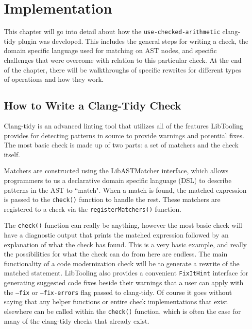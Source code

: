 \chapter{Implementation}
\label{sec:implementation}

This chapter will go into detail about how the \texttt{use-checked-arithmetic} clang-tidy plugin was developed. This includes the general steps for writing a check, the domain specific language used for matching on AST nodes, and specific challenges that were overcome with relation to this particular check. At the end of the chapter, there will be walkthroughs of specific rewrites for different types of operations and how they work.

\section{How to Write a Clang-Tidy Check}

Clang-tidy is an advanced linting tool that utilizes all of the features LibTooling provides for detecting patterns in source to provide warnings and potential fixes. The most basic check is made up of two parts: a set of matchers and the check itself.

Matchers are constructed using the LibASTMatcher interface, which allows programmers to us a declarative domain specific language (DSL) to describe patterns in the AST to ``match". When a match is found, the matched expression is passed to the \texttt{check()} function to handle the rest. These matchers are registered to a check via the \texttt{registerMatchers()} function.

The \texttt{check()} function can really be anything, however the most basic check will have a diagnostic output that prints the matched expression followed by an explanation of what the check has found. This is a very basic example, and really the possibilities for what the check can do from here are endless. The main functionality of a code modernization check will be to generate a rewrite of the matched statement. LibTooling also provides a convenient \texttt{FixItHint} interface for generating suggested code fixes beside their warnings that a user can apply with the \texttt{--fix} or \texttt{--fix-errors} flag passed to clang-tidy. Of course it goes without saying that any helper functions or entire check implementations that exist elsewhere can be called within the \texttt{check()} function, which is often the case for many of the clang-tidy checks that already exist.

